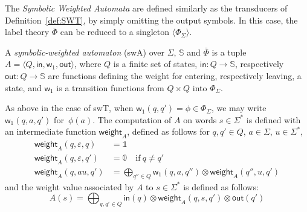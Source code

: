 \documentclass[runningheads]{llncs}
\def\<#1>{\langle #1 \rangle}
\newcommand{\Semiring}{\mathbb{S}}
\newcommand{\zero}{\mathbb{0}}
\newcommand{\one}{\mathbb{1}}
\def\SWT{\textsf{swT}\xspace}
\def\SWA{\textsf{swA}\xspace}
\def\weight{\mathsf{weight}}
\def\wei{\mathsf{w}}
\def\init{\mathsf{in}}
\def\final{\mathsf{out}}
\begin{document}
\noindent
The \emph{Symbolic Weighted Automata} %
are defined similarly as the transducers of Definition~\ref{def:SWT}, 
by simply omitting the output symbols.
%
In this case, the label theory $\bar\Phi$ can be reduced to a singleton $\< \Phi_\Sigma>$.
%
\begin{definition} \label{def:SWA}
A \emph{symbolic-weighted automaton} (\SWA)
over $\Sigma$, $\Semiring$ and $\bar\Phi$
is a tuple
$A = \< Q, \init, {\wei_1}, \final >$,
where $Q$ is a finite set of states, 
$\mathsf{in} : Q \to \Semiring$, %
respectively $\mathsf{out} : Q \to \Semiring$  %
are functions defining the weight for entering, 
respectively leaving, a state, 
and ${\wei_1}$ is a transition functions 
from $Q \times Q$ into $\Phi_{\Sigma}$.
\end{definition}
%      
\noindent
As above in the case of \SWT, 
when $\wei_1(q, q') = \phi \in \Phi_\Sigma$, 
we may write $\wei_1(q, a, q')$ for~$\phi(a)$. 
The computation of $A$ on words $s \in \Sigma^*$
is defined with an intermediate function $\weight_A$, 
defined as follows for $q, q' \in Q$, $a \in \Sigma$, $u \in \Sigma^*$,
%
\begin{align}
\weight_A(q, \varepsilon, q) & = \one\\ %
\weight_A(q, \varepsilon, q') & = \zero \quad \mathrm{if~} q \neq q'\nonumber\\
\weight_A(q, au, q') & =  \displaystyle\bigoplus_{q'' \in Q} 
    \wei_{1}(q, a, q'') \otimes \weight_A(q'', u, q')\nonumber
\label{eq:SWA-weight}
\end{align}
%
\noindent
and the weight value associated by $A$ to 
$s \in \Sigma^*$ is defined as follows: %
\begin{equation}
A(s)  = 
\displaystyle\bigoplus_{q, q' \in Q} \init(q) 
\mathop{\otimes} \weight_A(q, s, q') \mathop{\otimes} \final(q') 
\label{eq:SWA-value}
\end{equation}


%
      
\end{document}
